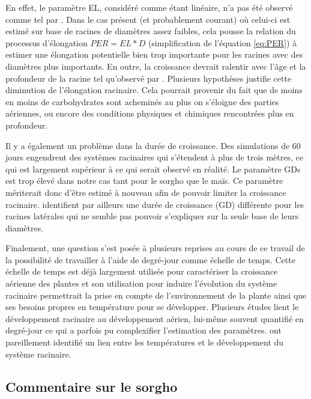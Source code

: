 En effet, le paramètre EL, considéré comme étant linéaire, n'a pas été observé comme tel par \cite{pellerinand_evaluation_1994}.
Dans le cas présent (et probablement courant) où celui-ci est estimé sur base de racines de diamètres assez faibles, cela pousse la relation du processus d'élongation $PER = EL*D$ (simplification de l'équation \ref{eq:PER}) à estimer une élongation potentielle bien trop importante pour les racines avec des diamètres plus importants.
En outre, la croissance devrait ralentir avec l'âge et la profondeur de la racine tel qu'observé par \cite{pellerinand_evaluation_1994}.
Plusieurs hypothèses justifie cette diminution de l'élongation racinaire.
Cela pourrait provenir du fait que de moins en moins de carbohydrates sont acheminés au plus on s'éloigne des parties aériennes, ou encore des conditions physiques et chimiques rencontrées plus en profondeur.
\newline

Il y a également un problème dans la durée de croissance.
Des simulations de 60 jours engendrent des systèmes racinaires qui s'étendent à plus de trois mètres, ce qui est largement supérieur à ce qui serait observé en réalité.
Le paramètre GDs est trop élevé dans notre cas tant pour le sorgho que le maïs.
Ce paramètre mériterait donc d'être estimé à nouveau afin de pouvoir limiter la croissance racinaire.
\cite{cahn_relationship_1989} identifient par ailleurs une durée de croissance (GD) différente pour les racines latérales qui ne semble pas pouvoir s'expliquer sur la seule base de leurs diamètres.
\newline

Finalement, une question s'est posée à plusieurs reprises au cours de ce travail de la possibilité de travailler à l'aide de degré-jour comme échelle de temps.
Cette échelle de temps est déjà largement utilisée pour caractériser la croissance aérienne des plantes et son utilisation pour induire l'évolution du système racinaire permettrait la prise en compte de l'environnement de la plante ainsi que ses besoins propres en température pour se développer.
Plusieurs études lient le développement racinaire au développement aérien, lui-même souvent quantifié en degré-jour ce qui a parfois pu complexifier l'estimation des paramètres.
\cite{pellerinand_evaluation_1994} ont pareillement identifié un lien entre les températures et le développement du système racinaire.

\subsection{Commentaire sur le sorgho}

